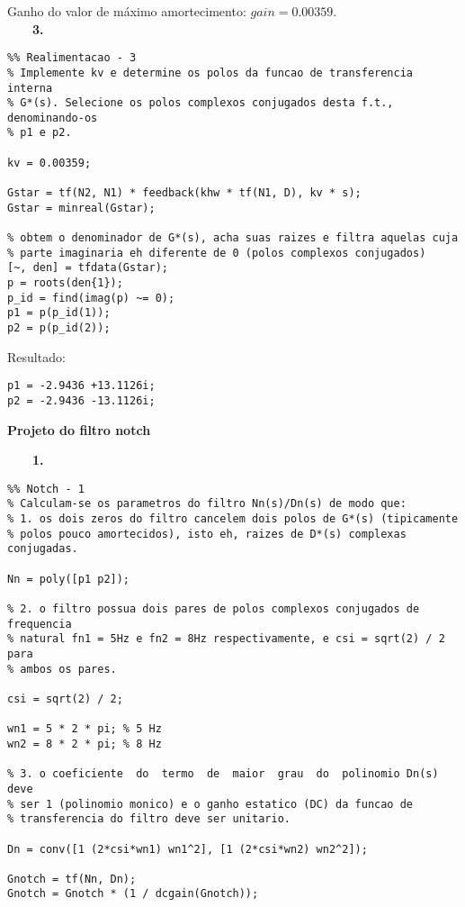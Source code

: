 \documentclass[a4paper,11pt]{article}
\begin{document}
Ganho do valor de máximo amortecimento: $gain = 0.00359$. \\

~~~~\textbf{3.}

\begin{lstlisting}
%% Realimentacao - 3
% Implemente kv e determine os polos da funcao de transferencia interna
% G*(s). Selecione os polos complexos conjugados desta f.t., denominando-os
% p1 e p2.

kv = 0.00359;

Gstar = tf(N2, N1) * feedback(khw * tf(N1, D), kv * s);
Gstar = minreal(Gstar);

% obtem o denominador de G*(s), acha suas raizes e filtra aquelas cuja
% parte imaginaria eh diferente de 0 (polos complexos conjugados)
[~, den] = tfdata(Gstar);
p = roots(den{1});
p_id = find(imag(p) ~= 0);
p1 = p(p_id(1));
p2 = p(p_id(2));
\end{lstlisting}

Resultado:

\begin{lstlisting}
p1 = -2.9436 +13.1126i;
p2 = -2.9436 -13.1126i;
\end{lstlisting}

\pagebreak

\textbf{Projeto do filtro notch}

~~~~\textbf{1.}

\begin{lstlisting}
%% Notch - 1
% Calculam-se os parametros do filtro Nn(s)/Dn(s) de modo que:
% 1. os dois zeros do filtro cancelem dois polos de G*(s) (tipicamente
% polos pouco amortecidos), isto eh, raizes de D*(s) complexas conjugadas.

Nn = poly([p1 p2]);

% 2. o filtro possua dois pares de polos complexos conjugados de frequencia
% natural fn1 = 5Hz e fn2 = 8Hz respectivamente, e csi = sqrt(2) / 2 para
% ambos os pares.

csi = sqrt(2) / 2;

wn1 = 5 * 2 * pi; % 5 Hz
wn2 = 8 * 2 * pi; % 8 Hz

% 3. o coeficiente  do  termo  de  maior  grau  do  polinomio Dn(s) deve
% ser 1 (polinomio monico) e o ganho estatico (DC) da funcao de
% transferencia do filtro deve ser unitario.

Dn = conv([1 (2*csi*wn1) wn1^2], [1 (2*csi*wn2) wn2^2]);

Gnotch = tf(Nn, Dn);
Gnotch = Gnotch * (1 / dcgain(Gnotch));
\end{lstlisting}
\end{document}
